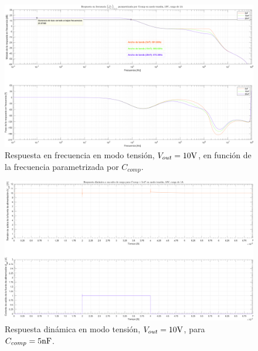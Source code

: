 \begin{figure}[H] %
\begin{center}
\includegraphics[width=1.1 \textwidth, angle=90]{./img/plots/rf/power_supply_CCOMP_RF_Modo1.png}
\caption{\label{fig:fig_power_supply_CCOMP_RF_Modo1}\footnotesize{Respuesta en frecuencia en modo tensión, $V_{out} = 10 \si[per-mode=symbol]{\volt}$, en función de la frecuencia parametrizada por $C_{comp}$.}}
\end{center}
\end{figure}

\clearpage

\begin{figure}[H] %
\begin{center}
\includegraphics[width=1.1 \textwidth, angle=90]{./img/plots/dynamic/power_supply_CCOMP_5n_STEP_Modo1.png}
\caption{\label{fig:fig_power_supply_CCOMP_STEP_5n_Modo1}\footnotesize{Respuesta dinámica en modo tensión, $V_{out} = 10 \si[per-mode=symbol]{\volt}$, para $C_{comp} = 5 \si[per-mode=symbol]{\nano\farad} $.}}
\end{center}
\end{figure}

